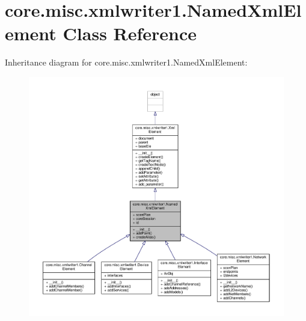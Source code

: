 \hypertarget{classcore_1_1misc_1_1xmlwriter1_1_1_named_xml_element}{\section{core.\+misc.\+xmlwriter1.\+Named\+Xml\+Element Class Reference}
\label{classcore_1_1misc_1_1xmlwriter1_1_1_named_xml_element}
}


Inheritance diagram for core.\+misc.\+xmlwriter1.\+Named\+Xml\+Element\+:
\nopagebreak
\begin{figure}[H]
\begin{center}
\leavevmode
\includegraphics[width=350pt]{classcore_1_1misc_1_1xmlwriter1_1_1_named_xml_element__inherit__graph}
\end{center}
\end{figure}



